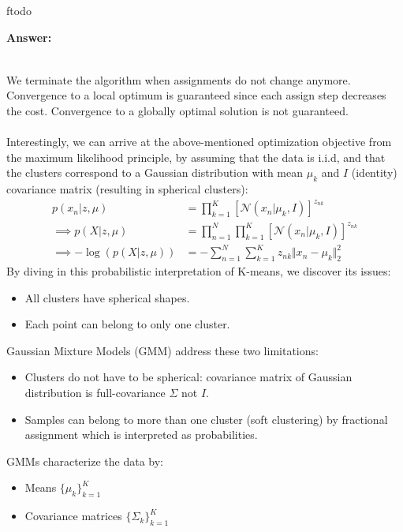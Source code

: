ƒtodo\documentclass{article}
\newenvironment{QandA}{\begin{enumerate}[label=\arabic*.]}{\end{enumerate}}
\newenvironment{InnerQandA}{\begin{enumerate}[label=\roman*.]}{\end{enumerate}}
\newenvironment{answer}{\par\normalfont \textbf{Answer:}}{}
\newcommand{\g}{\vert}
\begin{document}
\begin{QandA}
\begin{InnerQandA}
\begin{answer}
\begin{enumerate}[label=\arabic*.]
\begin{align*}
            \end{align*}
            \end{enumerate}
            We terminate the algorithm when assignments do not change anymore. Convergence to a local optimum is guaranteed since each assign step decreases the cost. Convergence to a globally optimal solution is not guaranteed. \\\\
            Interestingly, we can arrive at the above-mentioned optimization objective from the maximum likelihood principle, by assuming that the data is i.i.d, and that the clusters correspond to a Gaussian distribution with mean $\mu_k$ and $I$ (identity) covariance matrix (resulting in spherical clusters):
            \begin{align*}
                p(x_n \g z, \mu) &= \prod_{k=1}^K \left[ \mathcal{N}(x_n \g \mu_k, I) \right]^{z_{nk}}\\
                \implies p(X \g z, \mu) &= \prod_{n=1}^N \prod_{k=1}^K \left[ \mathcal{N}(x_n \g \mu_k, I) \right]^{z_{nk}} \\
                \implies -\log(p(X \g z, \mu)) &= - \sum_{n=1}^N\sum_{k=1}^K z_{nk} \Vert x_n - \mu_k \Vert^2_2
            \end{align*}
            By diving in this probabilistic interpretation of K-means, we discover its issues:
            \begin{itemize}
                \item All clusters have spherical shapes.
                \item Each point can belong to only one cluster.
            \end{itemize}
            Gaussian Mixture Models (GMM) address these two limitations:
            \begin{itemize}
                \item Clusters do not have to be spherical: covariance matrix of Gaussian distribution is full-covariance $\Sigma$ not $I$.
                \item Samples can belong to more than one cluster (soft clustering) by fractional assignment which is interpreted as probabilities.
            \end{itemize}
            GMMs characterize the data by:
            \begin{itemize}
                \item Means $\{\mu_k\}_{k=1}^K$ 
                \item Covariance matrices $\{\Sigma_k\}_{k=1}^K$ 

\end{itemize}
\end{answer}
\end{InnerQandA}
\end{QandA}
\end{document}
